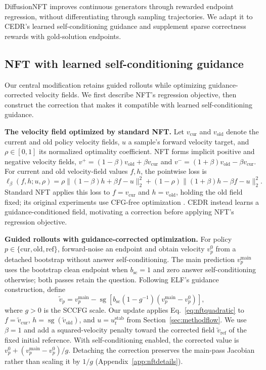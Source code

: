 \documentclass[11pt,letterpaper]{article}
\newcommand{\sg}{\operatorname{sg}}
\begin{document}
DiffusionNFT \citep{diffusionnft} improves continuous generators through rewarded endpoint regression, without differentiating through sampling trajectories. We adapt it to CEDR's learned self-conditioning guidance and supplement sparse correctness rewards with gold-solution endpoints.

\subsection{NFT with learned self-conditioning guidance}
\label{sec:nftsccfg}

Our central modification retains guided rollouts while optimizing guidance-corrected velocity fields. We first describe NFT's regression objective, then construct the correction that makes it compatible with learned self-conditioning guidance.

\textbf{The velocity field optimized by standard NFT.}
Let $v_{\mathrm{cur}}$ and $v_{\mathrm{old}}$ denote the current and old policy velocity fields, $u$ a sample's forward velocity target, and $\rho\in[0,1]$ its normalized optimality coefficient. NFT forms implicit positive and negative velocity fields, $v^+=(1-\beta)v_{\mathrm{old}}+\beta v_{\mathrm{cur}}$ and $v^-=(1+\beta)v_{\mathrm{old}}-\beta v_{\mathrm{cur}}$. For current and old velocity-field values $f,h$, the pointwise loss is
\begin{equation}
 \ell_\beta(f,h;u,\rho)
 =\rho\|(1-\beta)h+\beta f-u\|_2^2
 +(1-\rho)\|(1+\beta)h-\beta f-u\|_2^2.
\label{eq:nftquadratic}
\end{equation}
Standard NFT applies this loss to $f=v_{\mathrm{cur}}$ and $h=v_{\mathrm{old}}$, holding the old field fixed; its original experiments use CFG-free optimization \citep{diffusionnft}. CEDR instead learns a guidance-conditioned field, motivating a correction before applying NFT's regression objective.

\textbf{Guided rollouts with guidance-corrected optimization.}
For policy $p\in\{\mathrm{cur},\mathrm{old},\mathrm{ref}\}$, forward-noise an endpoint and obtain velocity $v_p^0$ from a detached bootstrap without answer self-conditioning. The main prediction $v_p^{\mathrm{main}}$ uses the bootstrap clean endpoint when $b_{\mathrm{sc}}=1$ and zero answer self-conditioning otherwise; both passes retain the question. Following ELF's guidance construction, define
\begin{equation}
 \widetilde v_p=v_p^{\mathrm{main}}-
 \sg\!\left[b_{\mathrm{sc}}(1-g^{-1})(v_p^{\mathrm{main}}-v_p^0)\right],
 \label{eq:nftcorrectedfield}
\end{equation}
where $g>0$ is the SCCFG scale. Our update applies Eq.~\eqref{eq:nftquadratic} to $f=\widetilde v_{\mathrm{cur}}$, $h=\sg(\widetilde v_{\mathrm{old}})$, and $u=u_t^{\mathrm{stab}}$ from Section~\ref{sec:methodflow}. We use $\beta=1$ and add a squared-velocity penalty toward the corrected field $\widetilde v_{\mathrm{ref}}$ of the fixed initial reference. With self-conditioning enabled, the corrected value is $v_p^0+(v_p^{\mathrm{main}}-v_p^0)/g$. Detaching the correction preserves the main-pass Jacobian rather than scaling it by $1/g$ (Appendix~\ref{app:nftdetails}).
\end{document}
